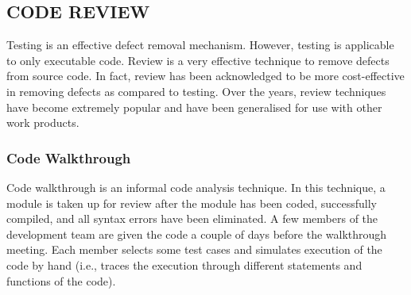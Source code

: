\documentclass[12pt]{article}
\begin{document}
\subsection{CODE REVIEW}
Testing is an effective defect removal mechanism. However, testing is
applicable to only executable code. Review is a very effective technique
to remove defects from source code. In fact, review has been
acknowledged to be more cost-effective in removing defects as
compared to testing. Over the years, review techniques have become
extremely popular and have been generalised for use with other work
products.
\subsubsection{Code Walkthrough}
Code walkthrough is an informal code analysis technique. In this technique,
a module is taken up for review after the module has been coded,
successfully compiled, and all syntax errors have been eliminated. A few
members of the development team are given the code a couple of days
before the walkthrough meeting. Each member selects some test cases and
simulates execution of the code by hand (i.e., traces the execution through
different statements and functions of the code).





	
\end{document}
